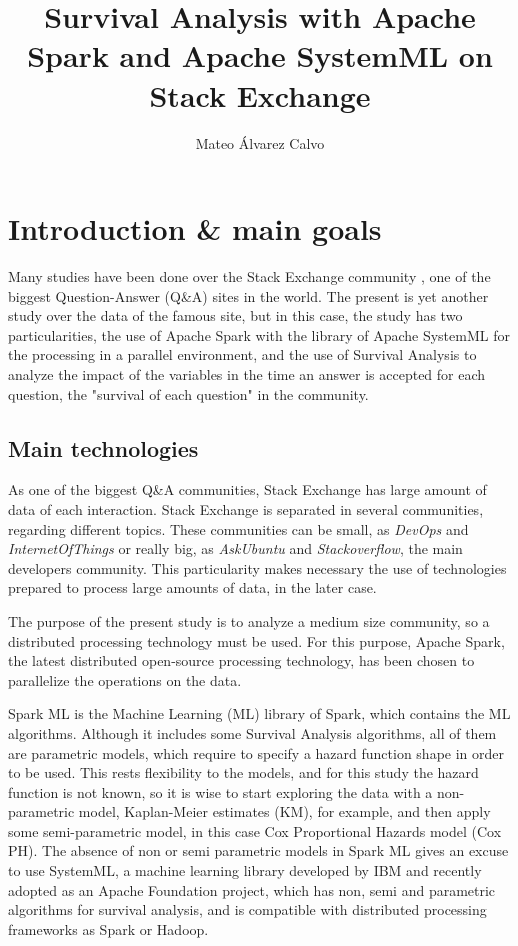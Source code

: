 \documentclass[11pt]{book} %
\title{Survival Analysis with Apache Spark and Apache SystemML on Stack Exchange}
\author{Mateo Álvarez Calvo}
\begin{document}
\maketitle

\newpage
\tableofcontents
\listoffigures
\listoftables
\lstlistoflistings


\chapter{Introduction \& main goals}
  \label{sec:introduction}
  Many studies have been done over the Stack Exchange community \cite{stackoverflow_paper}, one of the biggest Question-Answer (Q\&A) sites in the world. The present is yet another study over the data of the famous site, but in this case, the study has two particularities, the use of Apache Spark with the library of Apache SystemML for the processing in a parallel environment, and the use of Survival Analysis to analyze the impact of the variables in the time an answer is accepted for each question, the "survival of each question" in the community.


  \section{Main technologies}

    As one of the biggest Q\&A communities, Stack Exchange has large amount of data of each interaction.
    Stack Exchange is separated in several communities, regarding different topics. These communities can be small, as \emph{DevOps} and \emph{InternetOfThings} or really big, as \emph{AskUbuntu} and \emph{Stackoverflow}, the main developers community. This particularity makes necessary the use of technologies prepared to process large amounts of data, in the later case.

    The purpose of the present study is to analyze a medium size community, so a distributed processing technology must be used. For this purpose, Apache Spark, the latest distributed open-source processing technology, has been chosen to parallelize the operations on the data.

    Spark ML is the Machine Learning (ML) library of Spark, which contains the ML algorithms. Although it includes some Survival Analysis algorithms, all of them are parametric models, which require to specify a hazard function shape in order to be used. This rests flexibility to the models, and for this study the hazard function is not known, so it is wise to start exploring the data with a non-parametric model, Kaplan-Meier estimates (KM), for example, and then apply some semi-parametric model, in this case Cox Proportional Hazards model (Cox PH). The absence of non or semi parametric models in Spark ML gives an excuse to use SystemML, a machine learning library developed by IBM and recently adopted as an Apache Foundation project, which has non, semi and parametric algorithms for survival analysis, and is compatible with distributed processing frameworks as Spark or Hadoop.
\end{document}

